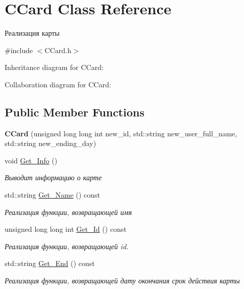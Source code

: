 \hypertarget{classCCard}{}\section{C\+Card Class Reference}
\label{classCCard}


Реализация карты  




{\ttfamily \#include $<$C\+Card.\+h$>$}



Inheritance diagram for C\+Card\+:


Collaboration diagram for C\+Card\+:
\subsection*{Public Member Functions}
\begin{DoxyCompactItemize}
\item 
{\bfseries C\+Card} (unsigned long long int new\+\_\+id, std\+::string new\+\_\+user\+\_\+full\+\_\+name, std\+::string new\+\_\+ending\+\_\+day)\hypertarget{classCCard_ac3173217d1bb0bb362981231f08c64a9}{}\label{classCCard_ac3173217d1bb0bb362981231f08c64a9}

\item 
void \hyperlink{classCCard_a8e53627729d198a1c7a202e4ca7d38f9}{Get\+\_\+\+Info} ()
\begin{DoxyCompactList}\small\item\em Выводит информацию о карте \end{DoxyCompactList}\item 
std\+::string \hyperlink{classCCard_afcfc2ac27e7e54636eee24b818f63d6b}{Get\+\_\+\+Name} () const 
\begin{DoxyCompactList}\small\item\em Реализация функции, возвращающей имя \end{DoxyCompactList}\item 
unsigned long long int \hyperlink{classCCard_a88c6220ef7622353728311db49bbe67b}{Get\+\_\+\+Id} () const 
\begin{DoxyCompactList}\small\item\em Реализация функции, возвращающей id. \end{DoxyCompactList}\item 
std\+::string \hyperlink{classCCard_a840f827a171f1cbc0d3b06924e6596cb}{Get\+\_\+\+End} () const 
\begin{DoxyCompactList}\small\item\em Реализация функции, возвращающей дату окончания срок действия карты \end{DoxyCompactList}\end{DoxyCompactItemize}



